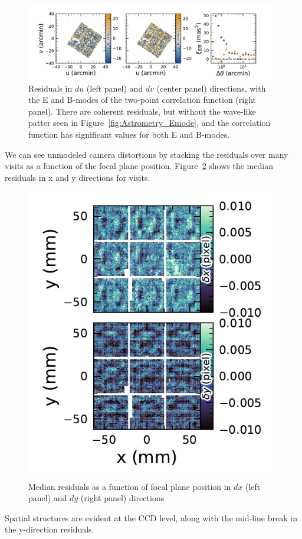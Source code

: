 \begin{figure}[htb!]
\centering
\includegraphics[width=0.98\linewidth]{Astrometry_2024120700527.pdf}
\caption{\small Residuals in $du$ (left panel) and $dv$ (center panel) directions, with the E and \gls{B}-modes of the two-point correlation function (right panel). There are coherent residuals, but without the wave-like patter seen in Figure~\ref{fig:Astrometry_Emode}, and the correlation function has significant values for both E and \gls{B}-modes.}
\label{fig:Astrometry_EBmode}
\vspace{0.1cm}
\end{figure}

We can see unmodeled \gls{camera} distortions by stacking the residuals over many visits as a function of the focal plane position.
Figure~\ref{fig:Astrometry_FoV} shows the median residuals in x and y directions for \nvisits visits.
\begin{figure}[htb!]
\centering
\includegraphics[width=\linewidth]{Astrometry_FoV.pdf}
\caption{Median residuals as a function of focal plane position in $dx$ (left panel) and $dy$ (right panel) directions}
\label{fig:Astrometry_FoV}
\end{figure}
Spatial structures are evident at the \gls{CCD} level, along with the mid-line break in the y-direction residuals.

